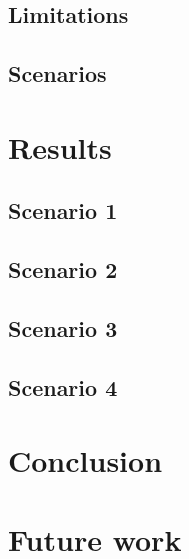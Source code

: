 \documentclass[9pt]{beamer}
\begin{document}
\subsection{Limitations}

\subsection{Scenarios}

\section{Results}
\subsection{Scenario 1}

\subsection{Scenario 2}

\subsection{Scenario 3}

\subsection{Scenario 4}

\section{Conclusion}

\section{Future work}


%  
%

\end{document}
